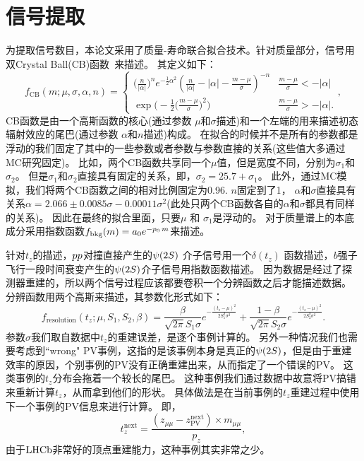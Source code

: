 \section{信号提取}
为提取信号数目，本论文采用了质量-寿命联合拟合技术。针对质量部分，信号用双Crystal Ball(CB)函数~\cite{Skwarnicki:1986xj}来描述。
其定义如下：
\begin{equation}
 f_{\mathrm{CB}}(m;\mu,\sigma,\alpha,n) = 
 \begin{cases} 
      \Big(\frac{n}{|\alpha|}\Big)^n e^{-\frac{1}{2}\alpha^2} (\frac{n}{|\alpha|}-|\alpha|-\frac{m-\mu}{\sigma})^{-n} & \frac{m-\mu}{\sigma} < -|\alpha|\\
   \exp\Bigg( -\frac{1}{2}\Big(\frac{m-\mu}{\sigma}\Big)^2\Bigg) & \frac{m-\mu}{\sigma}>-|\alpha|.
\end{cases},
\end{equation}
CB函数是由一个高斯函数的核心(通过参数 $\mu$和$\sigma$描述)和一个左端的用来描述初态辐射效应的尾巴(通过参数 $\alpha$和$n$描述)构成。
在拟合的时候并不是所有的参数都是浮动的我们固定了其中的一些参数或者参数与参数直接的关系(这些值大多通过MC研究固定)。
比如，两个CB函数共享同一个$\mu$值，但是宽度不同，分别为$\sigma_1$和$\sigma_2$。
但是$\sigma_1$和$\sigma_2$直接具有固定的关系，即，$\sigma_2=25.7+\sigma_1$。
此外，通过MC模拟，我们将两个CB函数之间的相对比例固定为0.96.
$n$固定到了1，
$\alpha$和$\sigma$直接具有关系$\alpha=2.066\pm0.0085\sigma-0.00011\sigma^2$(此处只两个CB函数各自的$\alpha$和$\sigma$都具有同样的关系)。
因此在最终的拟合里面，只要$\mu$ 和 $\sigma_1$是浮动的。
对于质量谱上的本底成分采用指数函数$f_{\rm bkg}(m)=a_0e^{-p_0\,m}$来描述。

针对$t_{z}$的描述，${pp}$对撞直接产生的${\psi{(2S)}}$ 介子信号用一个$\delta(t_z)$ 函数描述，$b$强子飞行一段时间衰变产生的${\psi{(2S)}}$介子信号用指数函数描述。
因为数据是经过了探测器重建的，所以两个信号过程应该都要卷积一个分辨函数之后才能描述数据。
分辨函数用两个高斯来描述，其参数化形式如下：
\begin{equation}
f_\mathrm{resolution}(t_z;\mu,S_1,S_2,\beta) = \frac{\beta}{\sqrt{2\pi}S_1\sigma} e^{-\frac{(t_z-\mu)^2}{2S_1^2\sigma^2}}
+\frac{1-\beta}{\sqrt{2\pi}S_2\sigma} e^{-\frac{(t_z-\mu)^2}{2S_2^2\sigma^2}}.
\end{equation}
参数$\sigma$我们取自数据中$t_z$的重建误差，是逐个事例计算的。
另外一种情况我们也需要考虑到``wrong" PV事例，这指的是该事例本身是真正的${\psi{(2S)}}$，但是由于重建效率的原因，个别事例的PV没有正确重建出来，从而指定了一个错误的PV。
这类事例的$t_z$分布会拖着一个较长的尾巴。
这种事例我们通过数据中故意将PV搞错来重新计算$t_z$，从而拿到他们的形状。
具体做法是在当前事例的$t_z$重建过程中使用下一个事例的PV信息来进行计算。 即，
\begin{equation}
t_z^\mathrm{next}=\frac{(z_{\mu\mu}-z_\mathrm{PV}^\mathrm{next})\times m_{\mu\mu}}{p_z},
\end{equation}
由于$\mbox{LHCb}$非常好的顶点重建能力，这种事例其实非常之少。


